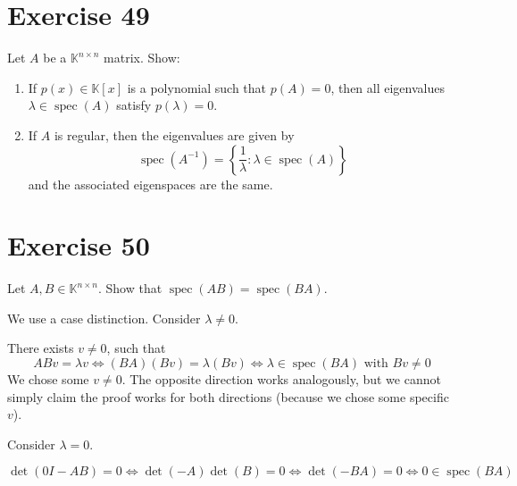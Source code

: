\documentclass[a4paper]{article}
\theoremstyle{definition}
\newcommand\set[1]{\left\{#1\right\}}
\begin{document}
\section*{Exercise 49}
\begin{ex}
  Let $A$ be a $\mathbb K^{n\times n}$ matrix. Show:
  \begin{enumerate}
    \item If $p(x) \in \mathbb K[x]$ is a polynomial such that $p(A) = 0$, then all eigenvalues $\lambda \in \operatorname{spec}(A)$ satisfy $p(\lambda) = 0$.
    \item If $A$ is regular, then the eigenvalues are given by
      \[ \operatorname{spec}(A^{-1}) = \set{\frac1{\lambda} : \lambda \in \operatorname{spec}(A)} \]
      and the associated eigenspaces are the same.
  \end{enumerate}
\end{ex}

\section*{Exercise 50}
\begin{ex}
  Let $A, B \in \mathbb K^{n \times n}$. Show that $\operatorname{spec}(AB) = \operatorname{spec}(BA)$.
\end{ex}

We use a case distinction. Consider $\lambda \neq 0$.

There exists $v \neq 0$, such that
\[ AB v = \lambda v \iff (BA)(Bv) = \lambda (Bv) \iff \lambda \in \operatorname{spec}(BA) \text{ with } Bv \neq 0 \]
We chose some $v \neq 0$. The opposite direction works analogously, but we cannot simply claim the proof works for both directions (because we chose some specific $v$).

Consider $\lambda = 0$.

\[ \det(0I - AB) = 0 \iff \det(-A) \det(B) = 0 \iff \det(-BA) = 0 \iff 0 \in \operatorname{spec}(BA) \]
\end{document}
